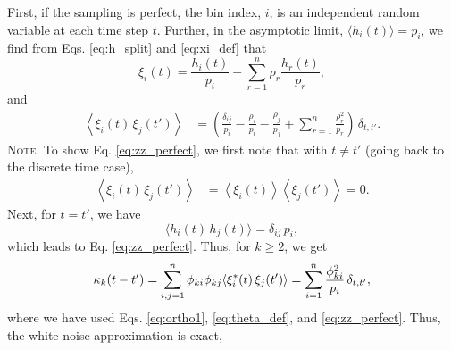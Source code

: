 \documentclass[reprint, superscriptaddress, floatfix]{revtex4-1}
\newcommand{\note}[1]{{\color{DarkGreen}\footnotesize \textsc{Note.} #1}}
\begin{document}
First, if the sampling is perfect,
%
%
the bin index, $i$, is an independent random variable
at each time step $t$.
%
Further, in the asymptotic limit,
$\langle h_i(t) \rangle = p_i$,
we find from Eqs. \eqref{eq:h_split} and \eqref{eq:xi_def} that
\begin{equation*}
  \xi_i(t)
  =
  \frac{ h_i(t) } { p_i }
  -
  \sum_{ r = 1 }^n
    \rho_r \frac{ h_r(t) } { p_r }
  ,
\end{equation*}
%
and
%
\begin{align}
  \left\langle
    \xi_i(t) \, \xi_j(t')
  \right\rangle
  &=
  \left(
    \frac{ \delta_{ij} } { p_i }
    -
    \frac{ \rho_i } { p_i }
    -
    \frac{ \rho_j } { p_j }
    +
    \sum_{r = 1}^n
    \frac{ \rho_r^2 } { p_r }
  \right) \,
  \delta_{t, t'}
  .
\label{eq:zz_perfect}
\end{align}
%
%
\note{To show Eq. \eqref{eq:zz_perfect}, we first note that
  with $t \ne t'$ (going back to the discrete time case),
  $$
  \begin{aligned}
  \left\langle
    \xi_i(t) \, \xi_j(t')
  \right\rangle
  &=
  \left\langle
    \xi_i(t)
  \right\rangle
  \left\langle
    \xi_j(t')
  \right\rangle
  =
  0.
  \end{aligned}
  $$
  Next, for $t = t'$, we have
  $$
  \langle
    h_i(t) \, h_j(t)
  \rangle
  = \delta_{ij} \, p_i
  ,
  $$
  which leads to Eq. \eqref{eq:zz_perfect}.
}
%
Thus,
for $k \ge 2$, we get
%
\begin{equation}
  \kappa_k(t - t')
  =
  \sum_{i,j = 1}^n
  \phi_{ki} \phi_{kj}
  \langle \xi_i^*(t) \, \xi_j(t') \rangle
  =
  \sum_{i = 1}^n \frac{ \phi_{ki}^2 } { p_i }
  \, \delta_{t, t'},
\notag
\end{equation}
%
where we have used
Eqs. \eqref{eq:ortho1},
\eqref{eq:theta_def},
and
\eqref{eq:zz_perfect}.
%
Thus, the white-noise approximation is exact,
\end{document}
